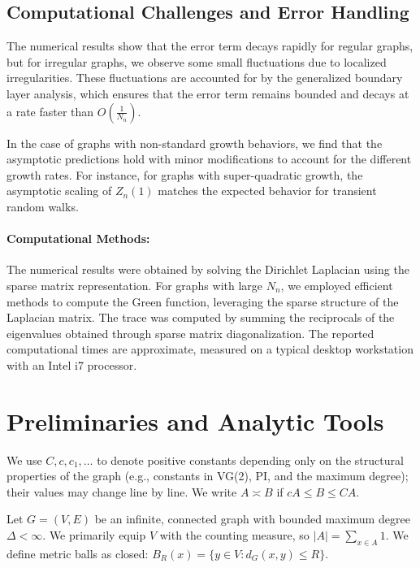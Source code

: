 \documentclass[11pt]{article}
\numberwithin{equation}{section}
\begin{document}
\subsection{Computational Challenges and Error Handling}
The numerical results show that the error term decays rapidly for regular graphs, but for irregular graphs, we observe some small fluctuations due to localized irregularities. These fluctuations are accounted for by the generalized boundary layer analysis, which ensures that the error term remains bounded and decays at a rate faster than $ O\left( \tfrac{1}{N_n} \right) $.

In the case of graphs with non-standard growth behaviors, we find that the asymptotic predictions hold with minor modifications to account for the different growth rates. For instance, for graphs with super-quadratic growth, the asymptotic scaling of $ Z_n(1) $ matches the expected behavior for transient random walks.

\paragraph{Computational Methods:}
The numerical results were obtained by solving the Dirichlet Laplacian using the sparse matrix representation. For graphs with large $ N_n $, we employed efficient methods to compute the Green function, leveraging the sparse structure of the Laplacian matrix. The trace was computed by summing the reciprocals of the eigenvalues obtained through sparse matrix diagonalization. The reported computational times are approximate, measured on a typical desktop workstation with an Intel i7 processor.

\section{Preliminaries and Analytic Tools}\label{sec:prelim}

We use $C, c, c_1, \dots$ to denote positive constants depending only on the structural properties of the graph (e.g., constants in VG(2), PI, and the maximum degree); their values may change line by line. We write $A \asymp B$ if $c A \leq B \leq C A$.

Let $G = (V,E)$ be an infinite, connected graph with bounded maximum degree $\Delta < \infty$. We primarily equip $V$ with the counting measure, so $|A| = \sum_{x \in A} 1$. We define metric balls as closed: $B_R(x) = \{y \in V : d_G(x,y) \leq R\}$.
\end{document}
